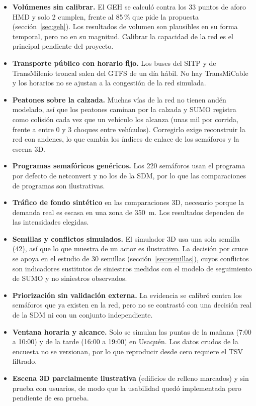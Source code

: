 \begin{itemize}[noitemsep]
    \item \textbf{Volúmenes sin calibrar.} El GEH se calculó contra los 33 puntos de aforo HMD y solo 2 cumplen, frente al 85\,\% que pide la propuesta (sección~\ref{sec:geh}). Los resultados de volumen son plausibles en su forma temporal, pero no en su magnitud. Calibrar la capacidad de la red es el principal pendiente del proyecto.
    \item \textbf{Transporte público con horario fijo.} Los buses del SITP y de TransMilenio troncal salen del GTFS de un día hábil. No hay TransMiCable y los horarios no se ajustan a la congestión de la red simulada.
    \item \textbf{Peatones sobre la calzada.} Muchas vías de la red no tienen andén modelado, así que los peatones caminan por la calzada y SUMO registra como colisión cada vez que un vehículo los alcanza (unas mil por corrida, frente a entre 0 y 3 choques entre vehículos). Corregirlo exige reconstruir la red con andenes, lo que cambia los índices de enlace de los semáforos y la escena 3D.
    \item \textbf{Programas semafóricos genéricos.} Los 220 semáforos usan el programa por defecto de netconvert y no los de la SDM, por lo que las comparaciones de programas son ilustrativas.
    \item \textbf{Tráfico de fondo sintético} en las comparaciones 3D, necesario porque la demanda real es escasa en una zona de 350~m. Los resultados dependen de las intensidades elegidas.
    \item \textbf{Semillas y conflictos simulados.} El simulador 3D usa una sola semilla (42), así que lo que muestra de un actor es ilustrativo. La decisión por cruce se apoya en el estudio de 30 semillas (sección~\ref{sec:semillas}), cuyos conflictos son indicadores sustitutos de siniestros medidos con el modelo de seguimiento de SUMO y no siniestros observados.
    \item \textbf{Priorización sin validación externa.} La evidencia se calibró contra los semáforos que ya existen en la red, pero no se contrastó con una decisión real de la SDM ni con un conjunto independiente.
    \item \textbf{Ventana horaria y alcance.} Solo se simulan las puntas de la mañana (7:00 a 10:00) y de la tarde (16:00 a 19:00) en Usaquén. Los datos crudos de la encuesta no se versionan, por lo que reproducir desde cero requiere el TSV filtrado.
    \item \textbf{Escena 3D parcialmente ilustrativa} (edificios de relleno marcados) y sin prueba con usuarios, de modo que la usabilidad quedó implementada pero pendiente de esa prueba.
\end{itemize}

